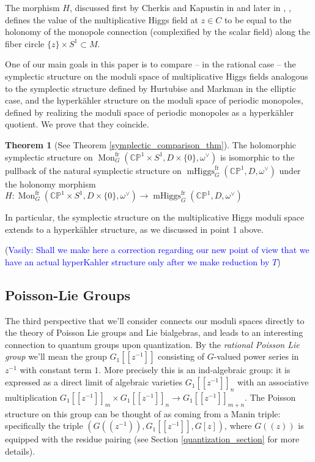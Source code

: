 \documentclass[11pt, oneside, reqno]{amsart}
\theoremstyle{definition} \newtheorem{definition}{Definition}[section]
\newtheorem{theorem}[definition]{Theorem}
\theoremstyle{definition} \newtheorem{remark}[definition]{Remark}
\theoremstyle{definition} \newtheorem{remarks}[definition]{Remarks}
\theoremstyle{definition} \newtheorem{question}[definition]{Question}
\theoremstyle{definition} \newtheorem*{note}{Note}
\theoremstyle{definition} \newtheorem{example}[definition]{Example}
\theoremstyle{definition} \newtheorem{examples}[definition]{Examples}
\newcommand{\bb}[1]{\mathbb{#1}}
\DeclareMathOperator{\mhiggs}{mHiggs}
\DeclareMathOperator{\mon}{Mon}
\newcommand{\fr}{\mathrm{fr}}
\newcommand{\vasily}[1]{(\textcolor{blue}{Vasily: #1})}
\begin{document}
The morphism $H$,  discussed first by Cherkis and Kapustin in \cite{CherkisKapustin2} and later in
\cite{CharbonneauHurtubise}, \cite{Smith}, \cite{NekrasovPestun}
defines the value of the multiplicative Higgs field at $z \in C$ to be equal to
the holonomy of the monopole connection (complexified by the scalar field) along the fiber circle $\{z\} \times S^{1} \subset M$.

One of our main goals in this paper is to compare -- in the rational case -- the symplectic structure on the moduli space of multiplicative Higgs fields analogous to the symplectic structure defined by Hurtubise and Markman in the elliptic case, and the hyperk\"ahler structure on the moduli space of periodic monopoles, defined by realizing the moduli space of periodic monopoles as a hyperk\"ahler quotient.  We prove that they coincide.

\begin{theorem}[See Theorem \ref{symplectic_comparison_thm}]
  The holomorphic symplectic structure on
  $\mon_G^\fr(\bb{CP}^1 \times S^1,D \times\{0\},\omega^\vee)$ is isomorphic to the pullback of the natural symplectic structure on
  $\mhiggs_G^{\text{fr}}(\bb{CP}^1,D,\omega^\vee)$ under the holonomy morphism $H \colon \mon_G^\fr(\bb{CP}^1 \times S^1,D \times\{0\},\omega^\vee) \to \mhiggs_G^{\text{fr}}(\bb{CP}^1,D,\omega^\vee)$  
\end{theorem}

In particular, the symplectic structure on the multiplicative Higgs moduli space extends to a hyperk\"ahler structure, as we discussed in point 1 above.

\vasily{Shall we make here a correction regarding our new point of view that we have an actual hyperKahler structure only after we make reduction by $T$}

\subsection{Poisson-Lie Groups}
The third perspective that we'll consider connects our moduli spaces directly to the theory of Poisson Lie groups and Lie bialgebras, and leads to an interesting connection to quantum groups upon quantization.  By the \emph{rational Poisson Lie group} we'll mean the group $G_1[[z^{-1}]]$ consisting of $G$-valued power series in $z^{-1}$ with constant term $1$.  More precisely this is an ind-algebraic group: it is expressed as a direct limit of algebraic varieties $G_1[[z^{-1}]]_n$ with an associative multiplication $G_1[[z^{-1}]]_m \times G_1[[z^{-1}]]_n \to G_1[[z^{-1}]]_{m+n}$.  The Poisson structure on this group can be thought of as coming from a Manin triple: specifically the triple $(G(\!(z^{-1})\!), G_1[[z^{-1}]], G[z])$, where $G(\!(z)\!)$ is equipped with the residue pairing (see Section \ref{quantization_section} for more details).  
\end{document}
